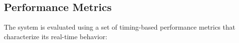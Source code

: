 \documentclass[conference]{IEEEtran}
\begin{document}

\subsection{Performance Metrics}

The system is evaluated using a set of timing-based performance metrics that characterize its real-time behavior:
\end{document}
